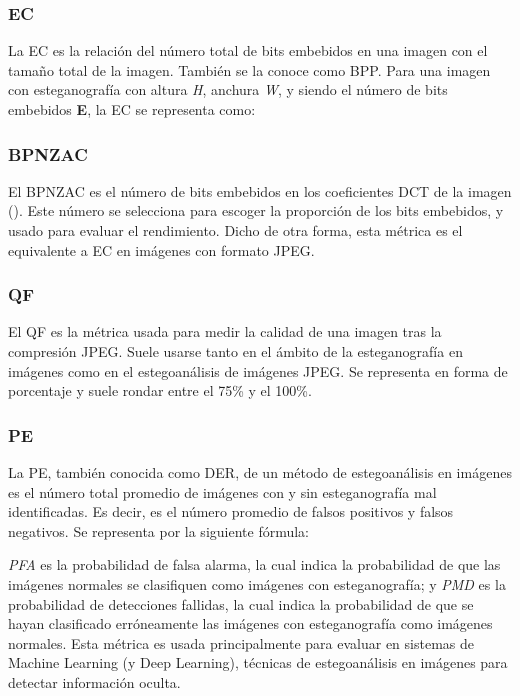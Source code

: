 \subsubsection{EC}

La \ac{EC} es la relación del número total de bits embebidos en una imagen con el tamaño total de la imagen. También se la conoce como \ac{BPP}. Para una imagen con esteganografía con altura \textit{H}, anchura \textit{W}, y siendo el número de bits embebidos \textbf{E}, la \ac{EC} se representa como:


\subsubsection{BPNZAC}

El \ac{BPNZAC} es el número de bits embebidos en los coeficientes \ac{DCT} de la imagen (\cite{dct}). Este número se selecciona para escoger la proporción de los bits embebidos, y usado para evaluar el rendimiento. Dicho de otra forma, esta métrica es el equivalente a \ac{EC} en imágenes con formato JPEG. %

\subsubsection{QF}

El \ac{QF} es la métrica usada para medir la calidad de una imagen tras la compresión JPEG. Suele usarse tanto en el ámbito de la esteganografía en imágenes como en el estegoanálisis de imágenes JPEG. Se representa en forma de porcentaje y suele rondar entre el 75\% y el 100\%.

\subsubsection{PE}

La \ac{PE}, también conocida como \ac{DER}, de un método de estegoanálisis en imágenes es el número total promedio de imágenes con y sin esteganografía mal identificadas. Es decir, es el número promedio de falsos positivos y falsos negativos. Se representa por la siguiente fórmula:


\textit{PFA} es la probabilidad de falsa alarma, la cual indica la probabilidad de que las imágenes normales se clasifiquen como imágenes con esteganografía; y \textit{PMD} es la probabilidad de detecciones fallidas, la cual indica la probabilidad de que se hayan clasificado erróneamente las imágenes con esteganografía como imágenes normales. Esta métrica es usada principalmente para evaluar en sistemas de Machine Learning (y Deep Learning), técnicas de estegoanálisis en imágenes para detectar información oculta.

